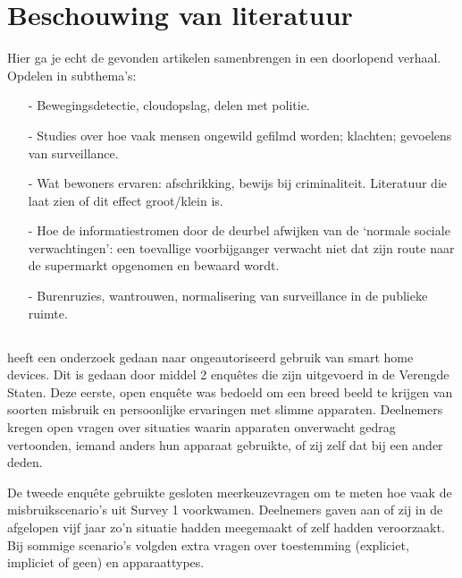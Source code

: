 \documentclass[nonacm,sigconf]{acmart}
\begin{document}
    \section{Beschouwing van literatuur}
    \begin{editorsonlyBox}
        Hier ga je echt de gevonden artikelen samenbrengen in een doorlopend verhaal.
        Opdelen in subthema’s:

        \begin{itemize}[leftmargin = *,listparindent =1cm]
            \item[-] Bewegingsdetectie, cloudopslag, delen met politie.
            \item[-] Studies over hoe vaak mensen ongewild gefilmd worden; klachten; gevoelens van surveillance.
            \item[-] Wat bewoners ervaren: afschrikking, bewijs bij criminaliteit. Literatuur die laat zien of dit effect groot/klein is.
            \item[-] Hoe de informatiestromen door de deurbel afwijken van de ‘normale sociale verwachtingen’: een toevallige voorbijganger verwacht niet dat zijn route naar de supermarkt opgenomen en bewaard wordt.
            \item[-] Burenruzies, wantrouwen, normalisering van surveillance in de publieke ruimte.
        \end{itemize}
    \end{editorsonlyBox}

    \subsection{}

    \parencite{moh2023characterizing} heeft een onderzoek gedaan naar ongeautoriseerd gebruik van smart home devices.
    Dit is gedaan door middel 2 enquêtes die zijn uitgevoerd in de Verengde Staten.
    Deze eerste, open enquête was bedoeld om een breed beeld te krijgen van soorten misbruik en persoonlijke ervaringen met slimme apparaten.
    Deelnemers kregen open vragen over situaties waarin apparaten onverwacht gedrag vertoonden, iemand anders hun apparaat gebruikte, of zij zelf dat bij een ander deden.

    De tweede enquête gebruikte gesloten meerkeuzevragen om te meten hoe vaak de misbruikscenario’s uit Survey 1 voorkwamen.
    Deelnemers gaven aan of zij in de afgelopen vijf jaar zo’n situatie hadden meegemaakt of zelf hadden veroorzaakt.
    Bij sommige scenario’s volgden extra vragen over toestemming (expliciet, impliciet of geen) en apparaattypes.
\end{document}
